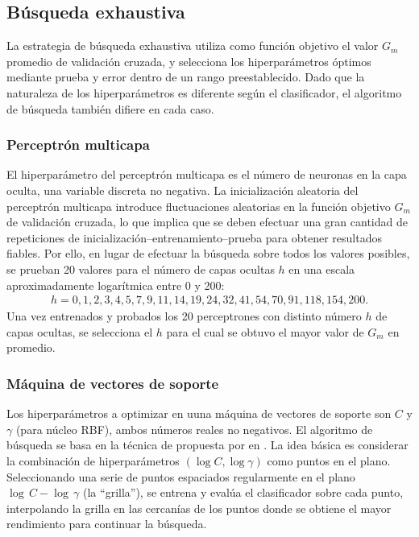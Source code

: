 %
%
\subsection{Búsqueda exhaustiva}
%
La estrategia de búsqueda exhaustiva utiliza como función objetivo el
valor $G_m$ promedio de validación cruzada, y selecciona los
hiperparámetros óptimos mediante prueba y error dentro de un rango
preestablecido. Dado que la naturaleza de los hiperparámetros es
diferente según el clasificador, el algoritmo de búsqueda también
difiere en cada caso.
%
\subsubsection{Perceptrón multicapa}
%
El hiperparámetro del perceptrón multicapa es el número de neuronas en
la capa oculta, una variable discreta no negativa.  La inicialización
aleatoria del perceptrón multicapa introduce fluctuaciones aleatorias
en la función objetivo $G_m$ de validación cruzada, lo que implica que
se deben efectuar una gran cantidad de repeticiones de
inicialización--entrenamiento--prueba para obtener resultados fiables.
Por ello, en lugar de efectuar la búsqueda sobre todos los valores
posibles, se prueban 20 valores para el número de capas ocultas $h$ en
una escala aproximadamente logarítmica entre 0 y 200:
%
\begin{align}
  \label{mlp-hidden-tries}
  h=0,1,2,3,4,5,7,9,11,14,19,24,32,41,54,70,91,118,154,200.
\end{align}
%
Una vez entrenados y probados los 20 perceptrones con distinto número
$h$ de capas ocultas, se selecciona el $h$ para el cual se obtuvo el
mayor valor de $G_m$ en promedio.
%
\subsubsection{Máquina de vectores de soporte}
%
Los hiperparámetros a optimizar en uuna máquina de vectores de soporte
son $C$ y $\gamma$ (para núcleo RBF), ambos números reales no
negativos.  El algoritmo de búsqueda se basa en la técnica de
 propuesta por \citeauthor{hsu} en
\cite{hsu}. La idea básica es considerar la combinación de
hiperparámetros $(\log C,\log\gamma)$ como puntos en el plano.
Seleccionando una serie de puntos espaciados regularmente en el plano
$\log\,C-\log\,\gamma$ (la ``grilla''), se entrena y evalúa el
clasificador sobre cada punto, interpolando la grilla en las cercanías
de los puntos donde se obtiene el mayor rendimiento para continuar la
búsqueda.


